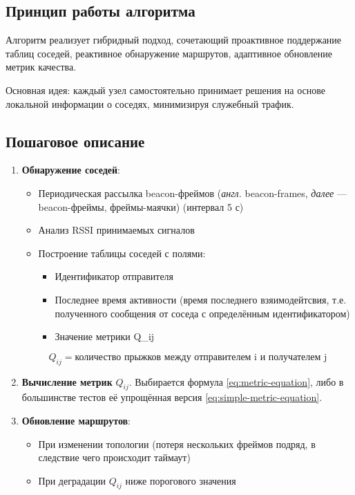 \subsection{Принцип работы алгоритма}

Алгоритм реализует гибридный подход, сочетающий проактивное поддержание таблиц соседей, реактивное обнаружение маршрутов, 
адаптивное обновление метрик качества.

Основная идея: каждый узел самостоятельно принимает решения на основе локальной информации о соседях, минимизируя служебный трафик.

\subsection{Пошаговое описание}

\begin{enumerate}
\item \textbf{Обнаружение соседей}:
\begin{itemize}
\item Периодическая рассылка beacon-фреймов (\textit{англ.} beacon-frames, \textit{далее} — beacon-фреймы, фреймы-маячки) (интервал 5 с)
\item Анализ RSSI принимаемых сигналов
\item Построение таблицы соседей с полями:
\begin{itemize}
\item Идентификатор отправителя
\item Последнее время активности (время последнего взяимодейтсвия, т.е. полученного сообщения от соседа с определённым идентификатором)
\item Значение метрики Q_{ij}
\end{itemize}
\end{itemize}
\begin{equation}
    \label{eq:simple-metric-equation}
    Q_{ij} = \text{количество прыжков между отправителем i и получателем j}
\end{equation}
\item \textbf{Вычисление метрик} $Q_{ij}$. Выбирается формула \ref{eq:metric-equation}, либо в большинстве тестов её упрощённая версия \ref{eq:simple-metric-equation}.

\item \textbf{Обновление маршрутов}:
\begin{itemize}
    \item При изменении топологии (потеря нескольких фреймов подряд, в следствие чего происходит таймаут)
    \item При деградации $Q_{ij}$ ниже порогового значения
\end{itemize}
\end{enumerate}


